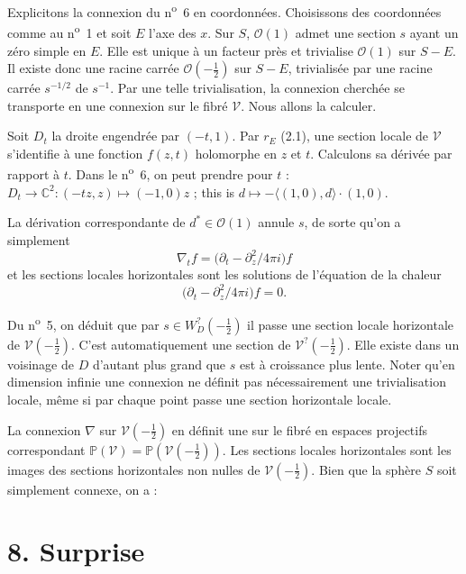 \documentclass[12pt,a4paper]{article}
\theoremstyle{plain}
\theoremstyle{definition}
\theoremstyle{remark}
\begin{document}
Explicitons la connexion du n\textsuperscript{o}~6 en coordonnées. Choisissons des coordonnées comme au n\textsuperscript{o}~1 et soit $E$ l'axe des $x$. Sur $S$, $\mathcal{O}(1)$ admet une section $s$ ayant un zéro simple en $E$. Elle est unique à un facteur près et trivialise $\mathcal{O}(1)$ sur $S - E$. Il existe donc une racine carrée $\mathcal{O}(-\frac{1}{2})$ sur $S - E$, trivialisée par une racine carrée $s^{-1/2}$ de $s^{-1}$. Par une telle trivialisation, la connexion cherchée se transporte en une connexion sur le fibré $\mathscr{V}$. Nous allons la calculer.

Soit $D_t$ la droite engendrée par $(-t, 1)$. Par $r_E$ (2.1), une section locale de $\mathscr{V}$ s'identifie à une fonction $f(z, t)$ holomorphe en $z$ et $t$. Calculons sa dérivée par rapport à $t$. Dans le n\textsuperscript{o}~6, on peut prendre pour $t$ : $D_t \to \mathbb{C}^2 : (-tz, z) \mapsto (-1, 0)z$ ; this is $d \mapsto -\langle(1, 0), d\rangle \cdot (1, 0)$.

La dérivation correspondante de $d^* \in \mathcal{O}(1)$ annule $s$, de sorte qu'on a simplement
\begin{equation}\label{eq:7.1}
\nabla_t f = \bigl(\partial_t - \partial_z^2/4\pi i\bigr)f\tag{7.1}
\end{equation}
et les sections locales horizontales sont les solutions de l'équation de la chaleur
\begin{equation}\label{eq:7.2}
\bigl(\partial_t - \partial_z^2/4\pi i\bigr)f = 0.\tag{7.2}
\end{equation}

Du n\textsuperscript{o}~5, on déduit que par $s \in W_D^?(-\frac{1}{2})$ il passe une section locale horizontale de $\mathscr{V}(-\frac{1}{2})$. C'est automatiquement une section de $\mathscr{V}^?(-\frac{1}{2})$. Elle existe dans un voisinage de $D$ d'autant plus grand que $s$ est à croissance plus lente. Noter qu'en dimension infinie une connexion ne définit pas nécessairement une trivialisation locale, même si par chaque point passe une section horizontale locale.

La connexion $\nabla$ sur $\mathscr{V}(-\frac{1}{2})$ en définit une sur le fibré en espaces projectifs correspondant $\mathbb{P}(\mathscr{V}) = \mathbb{P}(\mathscr{V}(-\frac{1}{2}))$. Les sections locales horizontales sont les images des sections horizontales non nulles de $\mathscr{V}(-\frac{1}{2})$. Bien que la sphère $S$ soit simplement connexe, on a :

\section*{8. Surprise}
\end{document}
